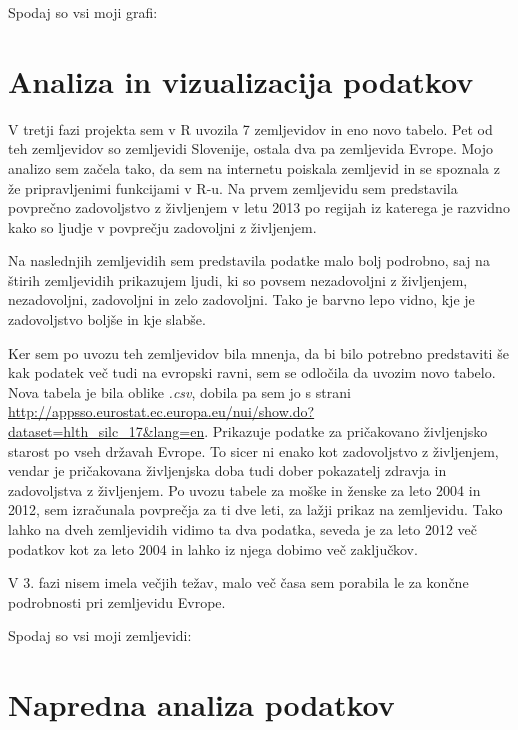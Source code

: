 \documentclass[11pt,a4paper]{article}
\begin{document}
Spodaj so vsi moji grafi:



 

\section{Analiza in vizualizacija podatkov}

V tretji fazi projekta sem v R uvozila 7 zemljevidov in eno novo tabelo. Pet od teh zemljevidov so zemljevidi Slovenije, ostala dva pa zemljevida Evrope. Mojo analizo sem začela tako, da sem na internetu poiskala zemljevid in se spoznala z že pripravljenimi funkcijami v R-u. Na prvem zemljevidu sem predstavila povprečno zadovoljstvo z življenjem v letu 2013 po regijah iz katerega je razvidno kako so ljudje v povprečju zadovoljni z življenjem.

Na naslednjih zemljevidih sem predstavila podatke malo bolj podrobno, saj na štirih zemljevidih prikazujem ljudi, ki so povsem nezadovoljni z življenjem, nezadovoljni, zadovoljni in zelo zadovoljni. Tako je barvno lepo vidno, kje je zadovoljstvo boljše in kje slabše.

Ker sem po uvozu teh zemljevidov bila mnenja, da bi bilo potrebno predstaviti še kak podatek več tudi na evropski ravni, sem se odločila da uvozim novo tabelo. Nova tabela je bila oblike \textit{.csv}, dobila pa sem jo s strani \url{http://appsso.eurostat.ec.europa.eu/nui/show.do?dataset=hlth_silc_17&lang=en}. Prikazuje podatke za pri\-ča\-ko\-va\-no življenjsko starost po vseh državah Evrope. To sicer ni enako kot zadovoljstvo z življenjem, vendar je pričakovana življenjska doba tudi dober pokazatelj zdravja in zadovoljstva z življenjem. Po uvozu tabele za moške in ženske za leto 2004 in 2012, sem izračunala povprečja za ti dve leti, za lažji prikaz na zemljevidu.  Tako lahko na dveh zemljevidih vidimo ta dva podatka, seveda je za leto 2012 več podatkov kot za leto 2004 in lahko iz njega dobimo več zaključkov.

V 3. fazi nisem imela večjih težav, malo več časa sem porabila le za končne podrobnosti pri zemljevidu Evrope.

Spodaj so vsi moji zemljevidi:





\section{Napredna analiza podatkov}

\end{document}
